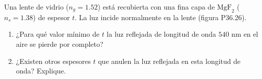\item Una lente de vidrio ($n_g = 1.52$) está recubierta con una fina capa de $\text{MgF}_2$ ($n_s = 1.38$) de espesor $t$. La luz incide normalmente en la lente (figura P36.26).
\begin{enumerate}
    \item ¿Para qué valor mínimo de $t$ la luz reflejada de longitud de onda $540\text{ nm}$ en el aire se pierde por completo?
    \item ¿Existen otros espesores $t$ que anulen la luz reflejada en esta longitud de onda? Explique.
\end{enumerate}